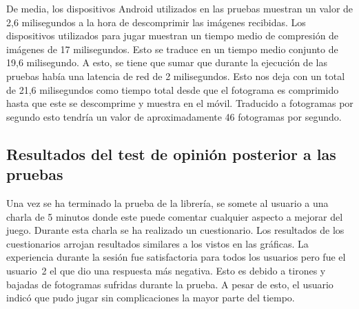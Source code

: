 De media, los dispositivos Android utilizados en las pruebas muestran un valor de 2,6 milisegundos a la hora de descomprimir las im\'agenes recibidas. Los dispositivos utilizados para jugar muestran un tiempo medio de compresi\'on de im\'agenes de 17 milisegundos. Esto se traduce en un tiempo medio conjunto de 19,6 milisegundo. A esto, se tiene que sumar que durante la ejecuci\'on de las pruebas hab\'ia una latencia de red de 2 milisegundos. Esto nos deja con un total de 21,6 milisegundos como tiempo total desde que el fotograma es comprimido hasta que este se descomprime y muestra en el m\'ovil. Traducido a fotogramas por segundo esto tendr\'ia un valor de aproximadamente 46 fotogramas por segundo.

\subsection{Resultados del test de opini\'on posterior a las pruebas}

Una vez se ha terminado la prueba de la librer\'ia, se somete al usuario a una charla de 5 minutos donde este puede comentar cualquier aspecto a mejorar del juego. Durante esta charla se ha realizado un cuestionario. Los resultados de los cuestionarios arrojan resultados similares a los vistos en las gr\'aficas. La experiencia durante la sesi\'on fue satisfactoria para todos los usuarios pero fue el usuario~2 el que dio una respuesta m\'as negativa. Esto es debido a tirones y bajadas de fotogramas sufridas durante la prueba. A pesar de esto, el usuario indic\'o que pudo jugar sin complicaciones la mayor parte del tiempo.

\begin{table}[h]
\caption{Resultados del test realizado a los usuarios posterior a la prueba}
\label{opinionesusuarios}
\end{table}


